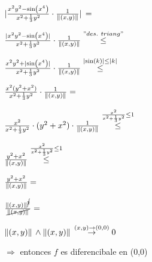 \documentclass[../parcial.tex]{subfiles}
\begin{document}
    $ \abs*{\frac{x^2y^2-\sin(x^4)}{x^2 + \frac{1}{3} y^2} \cdot\frac{1}{\norm*{(x,y)}}} = $

    $ \frac{\abs*{x^2y^2-\sin(x^4)}}{x^2 + \frac{1}{3} y^2} \cdot\frac{1}{\norm*{(x,y)}} \stackrel{"des.\ triang"}{\leq} $

    $ \frac{x^2y^2+\abs*{\sin(x^4)}}{x^2 + \frac{1}{3} y^2} \cdot\frac{1}{\norm*{(x,y)}} \stackrel{\abs*{\sin(k)} \leq \abs*{k}}{\leq} $

    $ \frac{x^2(y^2+x^2)}{x^2 + \frac{1}{3} y^2} \cdot\frac{1}{\norm*{(x,y)}} = $

    $ \frac{x^2}{x^2 + \frac{1}{3} y^2} \cdot (y^2+x^2) \cdot\frac{1}{\norm*{(x,y)}} \stackrel{\frac{x^2}{x^2 + \frac{1}{3} y^2} \leq 1}{\leq} $

    $ \frac{y^2+x^2}{\norm*{(x,y)}} \stackrel{\frac{x^2}{x^2 + \frac{1}{3} y^2} \leq 1}{\leq} $

    $ \frac{y^2+x^2}{\norm*{(x,y)}} = $

    $ \frac{\norm*{(x,y)}^{\cancel{2}}}{\cancel{\norm*{(x,y)}}} = $

    $ \norm*{(x,y)} \wedge \norm*{(x,y)} \stackrel{(x,y) \to (0,0)}{\to} 0 $

    $\Rightarrow $ entonces $f$ es diferencibale en (0,0)
\end{document}

